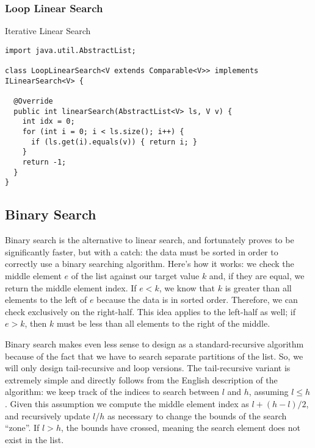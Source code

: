 \subsubsection*{Loop Linear Search}
\begin{cl}{Iterative Linear Search}
\begin{lstlisting}[language=MyJava]
import java.util.AbstractList;

class LoopLinearSearch<V extends Comparable<V>> implements ILinearSearch<V> {

  @Override
  public int linearSearch(AbstractList<V> ls, V v) {
    int idx = 0;
    for (int i = 0; i < ls.size(); i++) {
      if (ls.get(i).equals(v)) { return i; }
    }
    return -1;
  }
}
\end{lstlisting}
\end{cl}

\subsection*{Binary Search}

Binary search is the alternative to linear search, and fortunately proves to be significantly faster, but with a catch: the data must be sorted in order to correctly use a binary searching algorithm. Here's how it works: we check the middle element $e$ of the list against our target value $k$ and, if they are equal, we return the middle element index. If $e < k$, we know that $k$ is greater than all elements to the left of $e$ because the data is in sorted order. Therefore, we can check exclusively on the right-half. This idea applies to the left-half as well; if $e > k$, then $k$ must be less than all elements to the right of the middle. 

Binary search makes even less sense to design as a standard-recursive algorithm because of the fact that we have to search separate partitions of the list. So, we will only design tail-recursive and loop versions. The tail-recursive variant is extremely simple and directly follows from the English description of the algorithm: we keep track of the indices to search between $l$ and $h$, assuming $l \leq h$. Given this assumption we compute the middle element index as $l + (h - l) / 2$, and recursively update $l$/$h$ as necessary to change the bounds of the search ``zone''. If $l > h$, the bounds have crossed, meaning the search element does not exist in the list. 


